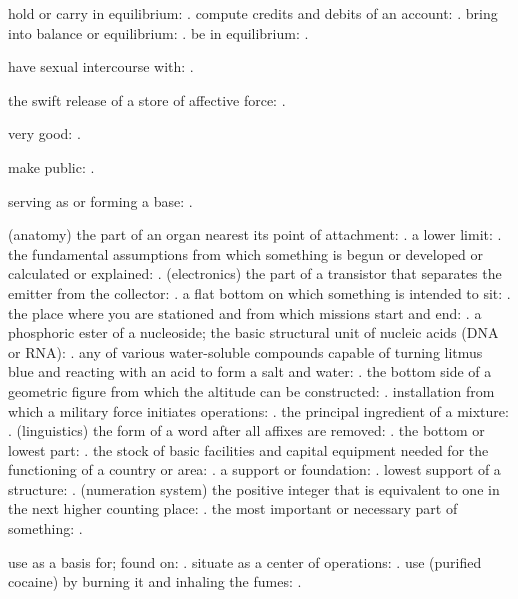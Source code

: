  hold or carry in equilibrium: . compute credits and debits of an account: . bring into balance or equilibrium: . be in equilibrium: .

  have sexual intercourse with: .

  the swift release of a store of affective force: .

  very good: .

  make public: .

  serving as or forming a base: .

  (anatomy) the part of an organ nearest its point of attachment: . a lower limit: . the fundamental assumptions from which something is begun or developed or calculated or explained: . (electronics) the part of a transistor that separates the emitter from the collector: . a flat bottom on which something is intended to sit: . the place where you are stationed and from which missions start and end: . a phosphoric ester of a nucleoside; the basic structural unit of nucleic acids (DNA or RNA): . any of various water-soluble compounds capable of turning litmus blue and reacting with an acid to form a salt and water: . the bottom side of a geometric figure from which the altitude can be constructed: . installation from which a military force initiates operations: . the principal ingredient of a mixture: . (linguistics) the form of a word after all affixes are removed: . the bottom or lowest part: . the stock of basic facilities and capital equipment needed for the functioning of a country or area: . a support or foundation: . lowest support of a structure: . (numeration system) the positive integer that is equivalent to one in the next higher counting place: . the most important or necessary part of something: .

  use as a basis for; found on: . situate as a center of operations: . use (purified cocaine) by burning it and inhaling the fumes: .


